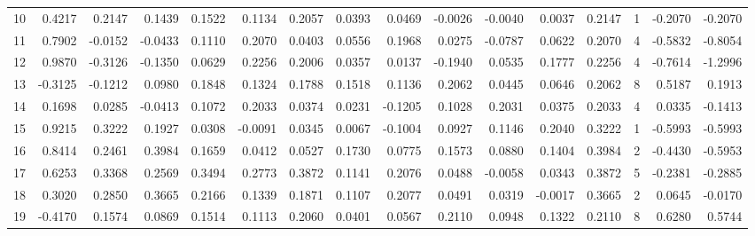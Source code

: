 \begin{tabular}{lrrrrrrrrrrrrrrr}
10 &      0.4217 &  0.2147 &  0.1439 &  0.1522 &  0.1134 &  0.2057 &  0.0393 &  0.0469 & -0.0026 & -0.0040 &   0.0037 &     0.2147 &      1 &                   -0.2070 &                    -0.2070 \\
11 &      0.7902 & -0.0152 & -0.0433 &  0.1110 &  0.2070 &  0.0403 &  0.0556 &  0.1968 &  0.0275 & -0.0787 &   0.0622 &     0.2070 &      4 &                   -0.5832 &                    -0.8054 \\
12 &      0.9870 & -0.3126 & -0.1350 &  0.0629 &  0.2256 &  0.2006 &  0.0357 &  0.0137 & -0.1940 &  0.0535 &   0.1777 &     0.2256 &      4 &                   -0.7614 &                    -1.2996 \\
13 &     -0.3125 & -0.1212 &  0.0980 &  0.1848 &  0.1324 &  0.1788 &  0.1518 &  0.1136 &  0.2062 &  0.0445 &   0.0646 &     0.2062 &      8 &                    0.5187 &                     0.1913 \\
14 &      0.1698 &  0.0285 & -0.0413 &  0.1072 &  0.2033 &  0.0374 &  0.0231 & -0.1205 &  0.1028 &  0.2031 &   0.0375 &     0.2033 &      4 &                    0.0335 &                    -0.1413 \\
15 &      0.9215 &  0.3222 &  0.1927 &  0.0308 & -0.0091 &  0.0345 &  0.0067 & -0.1004 &  0.0927 &  0.1146 &   0.2040 &     0.3222 &      1 &                   -0.5993 &                    -0.5993 \\
16 &      0.8414 &  0.2461 &  0.3984 &  0.1659 &  0.0412 &  0.0527 &  0.1730 &  0.0775 &  0.1573 &  0.0880 &   0.1404 &     0.3984 &      2 &                   -0.4430 &                    -0.5953 \\
17 &      0.6253 &  0.3368 &  0.2569 &  0.3494 &  0.2773 &  0.3872 &  0.1141 &  0.2076 &  0.0488 & -0.0058 &   0.0343 &     0.3872 &      5 &                   -0.2381 &                    -0.2885 \\
18 &      0.3020 &  0.2850 &  0.3665 &  0.2166 &  0.1339 &  0.1871 &  0.1107 &  0.2077 &  0.0491 &  0.0319 &  -0.0017 &     0.3665 &      2 &                    0.0645 &                    -0.0170 \\
19 &     -0.4170 &  0.1574 &  0.0869 &  0.1514 &  0.1113 &  0.2060 &  0.0401 &  0.0567 &  0.2110 &  0.0948 &   0.1322 &     0.2110 &      8 &                    0.6280 &                     0.5744 \\
\bottomrule
\end{tabular}
